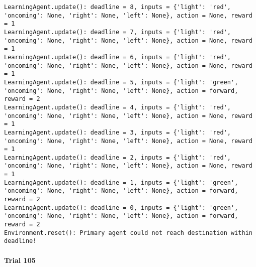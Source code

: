 \documentclass{article}
\begin{document}
\begin{verbatim}
LearningAgent.update(): deadline = 8, inputs = {'light': 'red', 'oncoming': None, 'right': None, 'left': None}, action = None, reward = 1
LearningAgent.update(): deadline = 7, inputs = {'light': 'red', 'oncoming': None, 'right': None, 'left': None}, action = None, reward = 1
LearningAgent.update(): deadline = 6, inputs = {'light': 'red', 'oncoming': None, 'right': None, 'left': None}, action = None, reward = 1
LearningAgent.update(): deadline = 5, inputs = {'light': 'green', 'oncoming': None, 'right': None, 'left': None}, action = forward, reward = 2
LearningAgent.update(): deadline = 4, inputs = {'light': 'red', 'oncoming': None, 'right': None, 'left': None}, action = None, reward = 1
LearningAgent.update(): deadline = 3, inputs = {'light': 'red', 'oncoming': None, 'right': None, 'left': None}, action = None, reward = 1
LearningAgent.update(): deadline = 2, inputs = {'light': 'red', 'oncoming': None, 'right': None, 'left': None}, action = None, reward = 1
LearningAgent.update(): deadline = 1, inputs = {'light': 'green', 'oncoming': None, 'right': None, 'left': None}, action = forward, reward = 2
LearningAgent.update(): deadline = 0, inputs = {'light': 'green', 'oncoming': None, 'right': None, 'left': None}, action = forward, reward = 2
Environment.reset(): Primary agent could not reach destination within deadline!
\end{verbatim}

\paragraph{Trial 105}\label{trial-105}
\end{document}
